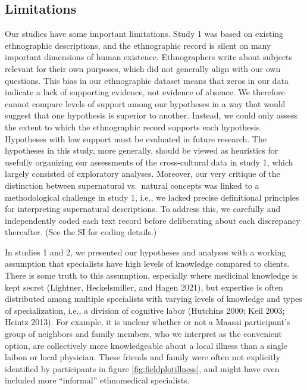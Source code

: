 \documentclass[
  11pt,
]{article}
\begin{document}
\hypertarget{limitations}{%
\subsection{Limitations}\label{limitations}}

Our studies have some important limitations. Study 1 was based on existing ethnographic descriptions, and the ethnographic record is silent on many important dimensions of human existence. Ethnographers write about subjects relevant for their own purposes, which did not generally align with our own questions. This bias in our ethnographic dataset means that zeros in our data indicate a lack of supporting evidence, not evidence of absence. We therefore cannot compare levels of support among our hypotheses in a way that would suggest that one hypothesis is superior to another. Instead, we could only assess the extent to which the ethnographic record supports each hypothesis. Hypotheses with low support must be evaluated in future research. The hypotheses in this study, more generally, should be viewed as heuristics for usefully organizing our assessments of the cross-cultural data in study 1, which largely consisted of exploratory analyses. Moreover, our very critique of the distinction between supernatural vs.~natural concepts was linked to a methodological challenge in study 1, i.e., we lacked precise definitional principles for interpreting supernatural descriptions. To address this, we carefully and independently coded each text record before deliberating about each discrepancy thereafter. (See the SI for coding details.)

In studies 1 and 2, we presented our hypotheses and analyses with a working assumption that specialists have high levels of knowledge compared to clients. There is some truth to this assumption, especially where medicinal knowledge is kept secret (Lightner, Heckelsmiller, and Hagen 2021), but expertise is often distributed among multiple specialists with varying levels of knowledge and types of specialization, i.e., a division of cognitive labor (Hutchins 2000; Keil 2003; Heintz 2013). For example, it is unclear whether or not a Maasai participant's group of neighbors and family members, who we interpret as the convenient option, are collectively more knowledgeable about a local illness than a single laibon or local physician. These friends and family were often not explicitly identified by participants in figure \ref{fig:fieldplotillness}, and might have even included more ``informal'' ethnomedical specialists.
\end{document}
